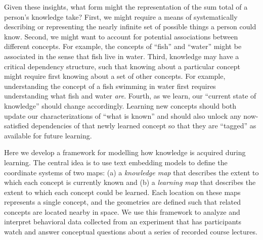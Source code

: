 \documentclass[10pt]{article}
\begin{document}
Given these insights, what form might the representation of the sum total of a
person's knowledge take? First, we might require a means of systematically
describing or representing the nearly infinite set of possible things a person
could know. Second, we might want to account for potential associations between
different concepts. For example, the concepts of ``fish'' and ``water'' might
be associated in the sense that fish live in water. Third, knowledge may have a
critical dependency structure, such that knowing about a particular concept
might require first knowing about a set of other concepts. For example,
understanding the concept of a fish swimming in water first requires
understanding what fish and water \textit{are}. Fourth, as we learn, our
``current state of knowledge'' should change accordingly. Learning new concepts
should both update our characterizations of ``what is known'' and should also
unlock any now-satisfied dependencies of that newly learned concept so that
they are ``tagged'' as available for future learning.

Here we develop a framework for modelling how knowledge is acquired during
learning. The central idea is to use text embedding models to define the
coordinate systems of two maps: (a) a \textit{knowledge map} that describes the
extent to which each concept is currently known and (b) a \textit{learning map}
that describes the extent to which each concept could be learned. Each location
on these maps represents a single concept, and the geometries are defined such
that related concepts are located nearby in space. We use this framework to
analyze and interpret behavioral data collected from an experiment that has
participants watch and answer conceptual questions about a series of recorded
course lectures.
\end{document}
